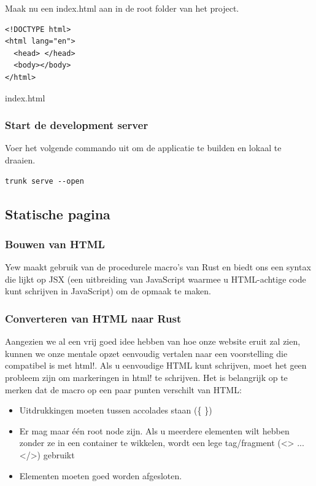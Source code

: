 Maak nu een index.html aan in de root folder van het project.

\begin{listing}[h]
\begin{verbatim}
<!DOCTYPE html>
<html lang="en">
  <head> </head>
  <body></body>
</html>
\end{verbatim}
\caption{index.html}
\end{listing}

\subsubsection{Start de development server}

Voer het volgende commando uit om de applicatie te builden en lokaal te draaien.

\begin{verbatim}
trunk serve --open
\end{verbatim}

\subsection{Statische pagina}

\subsubsection{Bouwen van HTML}

Yew maakt gebruik van de procedurele macro's van Rust en biedt ons een syntax die lijkt op JSX (een
uitbreiding van JavaScript waarmee u HTML-achtige code kunt schrijven in JavaScript) om de opmaak te
maken.

\clearpage

\subsubsection{Converteren van HTML naar Rust}

Aangezien we al een vrij goed idee hebben van hoe onze website eruit zal zien, kunnen we onze
mentale opzet eenvoudig vertalen naar een voorstelling die compatibel is met html!. Als u
eenvoudige HTML kunt schrijven, moet het geen probleem zijn om markeringen in html! te schrijven.
Het is belangrijk op te merken dat de macro op een paar punten verschilt van HTML:
\begin{itemize}
  \item Uitdrukkingen moeten tussen accolades staan (\{ \})
  \item Er mag maar één root node zijn. Als u
    meerdere elementen wilt hebben zonder ze in een container te wikkelen, wordt een lege
    tag/fragment (<> ... </>) gebruikt
  \item Elementen moeten goed worden afgesloten.
\end{itemize}

